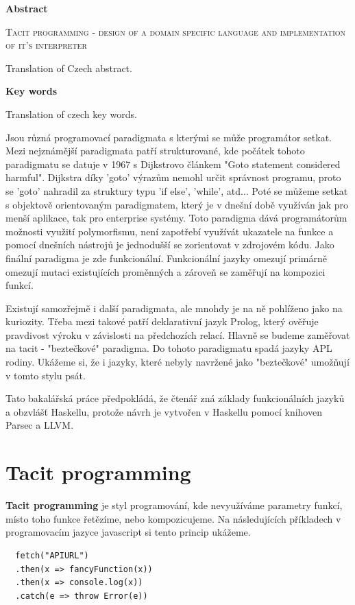 \documentclass[male,czech]{kithesis}
\newcommand{\TITULen}{Tacit programming - design of a domain specific language and implementation of it's interpreter} %
\begin{document}
\textbf{\textsf{Abstract}}

\textsc{\TITULen}

Translation of Czech abstract.

\textbf{\textsf{Key words}}

Translation of czech key words.

\tableofcontents


Jsou různá programovací paradigmata s kterými se může programátor setkat. Mezi nejznámější 
paradigmata patří strukturované, kde počátek tohoto paradigmatu se datuje v 1967 s Dijkstrovo článkem 
"Goto statement considered harmful". Dijkstra díky 'goto' výrazům nemohl určit správnost programu, proto 
se 'goto' nahradil za struktury typu 'if else', 'while', atd... Poté se můžeme setkat s objektově orientovaným
paradigmatem, který je v dnešní době využíván jak pro menší aplikace, tak pro enterprise systémy. Toto paradigma
dává programátorům možnosti využití polymorfismu, není zapotřebí využívát ukazatele na funkce a pomocí dnešních
nástrojů je jednodušší se zorientovat v zdrojovém kódu. Jako finální paradigma je zde funkcionální. Funkcionální jazyky
omezují primárně omezují mutaci existujících proměnných a zároveň se zaměřují na kompozici funkcí.

Existují samozřejmě i další paradigmata, ale mnohdy je na ně pohlíženo jako na kuriozity. Třeba 
mezi takové patří deklarativní jazyk Prolog, který ověřuje pravdivost výroku v závislosti na předchozích
relací.
Hlavně se budeme zaměřovat na tacit - "beztečkové" paradigma. Do tohoto paradigmatu spadá 
jazyky APL rodiny. Ukážeme si, že i jazyky, které nebyly navržené jako "beztečkové" umožňují v tomto stylu psát.

Tato bakalářská práce předpokládá, že čtenář zná základy funkcionálních jazyků a obzvlášť Haskellu, 
protože návrh je vytvořen v Haskellu pomocí knihoven Parsec a LLVM.

\chapter{Tacit programming}

\textbf{Tacit programming} je styl programování, kde nevyužíváme parametry funkcí, 
místo toho funkce řetězíme, nebo kompozicujeme. Na následujících příkladech v programovacím jazyce
javascript si tento princip ukážeme. 

\begin{verbatim}
  fetch("APIURL")
  .then(x => fancyFunction(x))
  .then(x => console.log(x))
  .catch(e => throw Error(e))
\end{verbatim}
\end{document}
